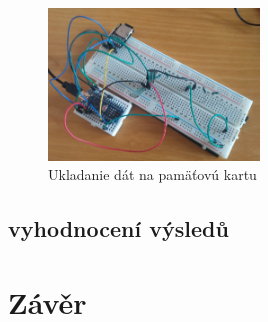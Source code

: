 \begin{figure}[hbt]
	\centering
	\includegraphics[width=0.5\textwidth]{obrazky-figures/FSRtestSD.png}
	\caption{Ukladanie dát na pamäťovú kartu}
	\label{Experiment1}
\end{figure}

\section{vyhodnocení výsledů}

\chapter{Závěr}

\label{zaver}

